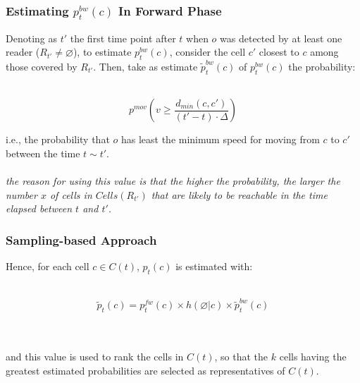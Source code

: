
\begin{frame}
\frametitle{Estimating $p_t^{bw}(c)$ In Forward Phase}

Denoting as $t'$ the first time point after $t$ when $o$ was detected by at least one reader ($R_{t'} \neq \varnothing$), to estimate $p_t^{bw}(c)$,  consider the cell $c'$ closest to $c$ among those covered by $R_{t'}$. Then, take as estimate $\widetilde{p}_t^{bw}(c)$ of $p_t^{bw}(c)$ the probability:\\~\\

\pause

\begin{equation}
  p^{mov}(v \geq \frac{d_{min}(c,c')}{(t'-t)\cdot\Delta})
\end{equation}

\pause

i.e., the probability that $o$ has least the minimum speed for moving from $c$ to $c'$ between the time $t \sim t'$.\\~\\

\textit{the reason for using this value is that the higher the probability, the larger the number $x$ of cells in $Cells(R_{t'})$ that are likely to be reachable in the time elapsed between $t$ and $t'$.}

\end{frame}


\begin{frame}
\frametitle{Sampling-based Approach}

Hence, for each cell $c \in C(t)$, $p_t(c)$ is estimated with:\\~\\

\pause

\begin{equation}
  \widetilde{p}_t(c) = p_t^{fw}(c) \times h(\varnothing|c) \times \widetilde{p}_t^{bw}(c)
\end{equation}\\~\\

\pause

and this value is used to rank the cells in $C(t)$, so that the $k$ cells having the greatest estimated probabilities are selected as representatives of $C(t)$.

\end{frame}

